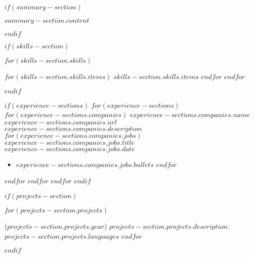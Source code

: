

\newcommand{\headerinfo}{
    \textbf{\Large $contact.name.first$ $contact.name.last$} \hfill
    $contact.address.county$, $contact.address.state$ \hfill
    ($contact.phone.area_code$) $contact.phone.number$ \hfill
    \href{$contact.email.link$}{$contact.email.address$} \hfill
    \href{$contact.linkedin.url$}{$contact.linkedin.text$} \hfill
    \href{$contact.gitlab.url$}{$contact.gitlab.text$}
}



\thispagestyle{firstpageheaderstyle}

\pagestyle{subsequentpageheaderstyle}

$if(summary-section)$
\begin{justify}
\vspace{-7.5pt}
$summary-section.content$
\end{justify}
$endif$

$if(skills-section)$
\vspace{-15pt}
\begin{description}[align=right,labelwidth=\skillswidth]
\setlength\itemsep{-2pt}
$for(skills-section.skills)$
\item [$skills-section.skills.heading$:]
\commasep{\ensuremath{\cdot}}
$for(skills-section.skills.items)$
$skills-section.skills.items$
$endfor$
\endcommasep
$endfor$
\end{description}
$endif$

$if(experience-sections)$
$for(experience-sections)$
$for(experience-sections.companies)$
\company
{$experience-sections.companies.name$}
{$experience-sections.companies.url$}
{$experience-sections.companies.description$}
$for(experience-sections.companies.jobs)$
\jobtitle
{$experience-sections.companies.jobs.title$}
{$experience-sections.companies.jobs.date$}
\begin{itemize}
\setlength\itemsep{-2pt}
$for(experience-sections.companies.jobs.bullets)$
\item $experience-sections.companies.jobs.bullets$
$endfor$
\end{itemize}
\vspace{-1pt}
$endfor$
$endfor$
\vspace{-4pt}
$endfor$
$endif$

$if(projects-section)$
\vspace{-15pt}
\begin{description}[align=left]
\setlength\itemsep{0pt}
$for(projects-section.projects)$
\item
[$projects-section.projects.name$]
($projects-section.projects.year$)
$projects-section.projects.description$.
$projects-section.projects.languages$
$endfor$
\end{description}
\vspace{-10pt}
$endif$


